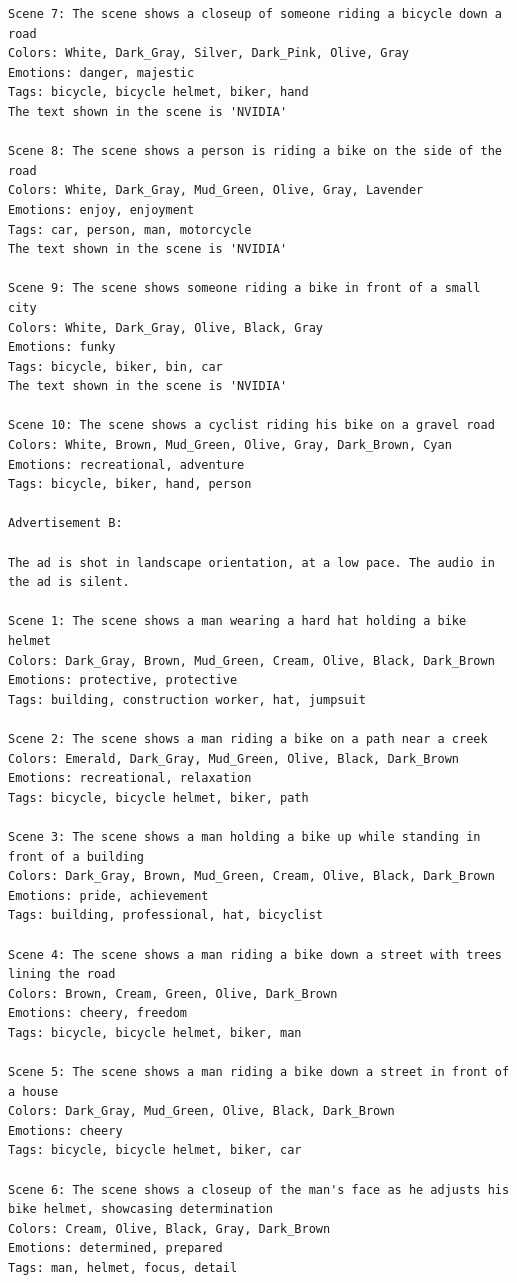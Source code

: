 \begin{lstlisting}[caption={},frame=single,breaklines=true,basicstyle=\tiny, label={lst:form}]
Scene 7: The scene shows a closeup of someone riding a bicycle down a road
Colors: White, Dark_Gray, Silver, Dark_Pink, Olive, Gray
Emotions: danger, majestic
Tags: bicycle, bicycle helmet, biker, hand
The text shown in the scene is 'NVIDIA' 

Scene 8: The scene shows a person is riding a bike on the side of the road
Colors: White, Dark_Gray, Mud_Green, Olive, Gray, Lavender
Emotions: enjoy, enjoyment
Tags: car, person, man, motorcycle
The text shown in the scene is 'NVIDIA' 

Scene 9: The scene shows someone riding a bike in front of a small city
Colors: White, Dark_Gray, Olive, Black, Gray
Emotions: funky
Tags: bicycle, biker, bin, car
The text shown in the scene is 'NVIDIA' 

Scene 10: The scene shows a cyclist riding his bike on a gravel road
Colors: White, Brown, Mud_Green, Olive, Gray, Dark_Brown, Cyan
Emotions: recreational, adventure
Tags: bicycle, biker, hand, person

Advertisement B:

The ad is shot in landscape orientation, at a low pace. The audio in the ad is silent.

Scene 1: The scene shows a man wearing a hard hat holding a bike helmet
Colors: Dark_Gray, Brown, Mud_Green, Cream, Olive, Black, Dark_Brown
Emotions: protective, protective
Tags: building, construction worker, hat, jumpsuit

Scene 2: The scene shows a man riding a bike on a path near a creek
Colors: Emerald, Dark_Gray, Mud_Green, Olive, Black, Dark_Brown
Emotions: recreational, relaxation
Tags: bicycle, bicycle helmet, biker, path

Scene 3: The scene shows a man holding a bike up while standing in front of a building
Colors: Dark_Gray, Brown, Mud_Green, Cream, Olive, Black, Dark_Brown
Emotions: pride, achievement
Tags: building, professional, hat, bicyclist

Scene 4: The scene shows a man riding a bike down a street with trees lining the road
Colors: Brown, Cream, Green, Olive, Dark_Brown
Emotions: cheery, freedom
Tags: bicycle, bicycle helmet, biker, man

Scene 5: The scene shows a man riding a bike down a street in front of a house
Colors: Dark_Gray, Mud_Green, Olive, Black, Dark_Brown
Emotions: cheery
Tags: bicycle, bicycle helmet, biker, car

Scene 6: The scene shows a closeup of the man's face as he adjusts his bike helmet, showcasing determination
Colors: Cream, Olive, Black, Gray, Dark_Brown
Emotions: determined, prepared
Tags: man, helmet, focus, detail


\end{lstlisting}
